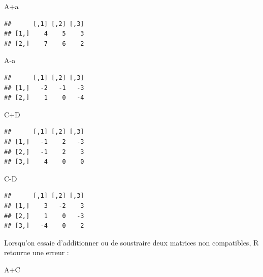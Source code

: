 \documentclass[
  11pt,
]{book}
\newenvironment{Shaded}{\begin{snugshade}}{\end{snugshade}}
\newcommand{\NormalTok}[1]{#1}
\newcommand{\SpecialCharTok}[1]{\textcolor[rgb]{0.00,0.00,0.00}{#1}}
\numberwithin{equation}{section}
\numberwithin{countremarque}{section}
\begin{document}
\begin{Shaded}
\begin{Highlighting}[]
\NormalTok{A}\SpecialCharTok{+}\NormalTok{a}
\end{Highlighting}
\end{Shaded}

\begin{lstlisting}
##      [,1] [,2] [,3]
## [1,]    4    5    3
## [2,]    7    6    2
\end{lstlisting}

\begin{Shaded}
\begin{Highlighting}[]
\NormalTok{A}\SpecialCharTok{{-}}\NormalTok{a}
\end{Highlighting}
\end{Shaded}

\begin{lstlisting}
##      [,1] [,2] [,3]
## [1,]   -2   -1   -3
## [2,]    1    0   -4
\end{lstlisting}

\begin{Shaded}
\begin{Highlighting}[]
\NormalTok{C}\SpecialCharTok{+}\NormalTok{D}
\end{Highlighting}
\end{Shaded}

\begin{lstlisting}
##      [,1] [,2] [,3]
## [1,]   -1    2   -3
## [2,]   -1    2    3
## [3,]    4    0    0
\end{lstlisting}

\begin{Shaded}
\begin{Highlighting}[]
\NormalTok{C}\SpecialCharTok{{-}}\NormalTok{D}
\end{Highlighting}
\end{Shaded}

\begin{lstlisting}
##      [,1] [,2] [,3]
## [1,]    3   -2    3
## [2,]    1    0   -3
## [3,]   -4    0    2
\end{lstlisting}

Lorsqu'on essaie d'additionner ou de soustraire deux matrices non compatibles, R retourne une erreur :

\begin{Shaded}
\begin{Highlighting}[]
\NormalTok{A}\SpecialCharTok{+}\NormalTok{C}
\end{Highlighting}
\end{Shaded}
\end{document}
